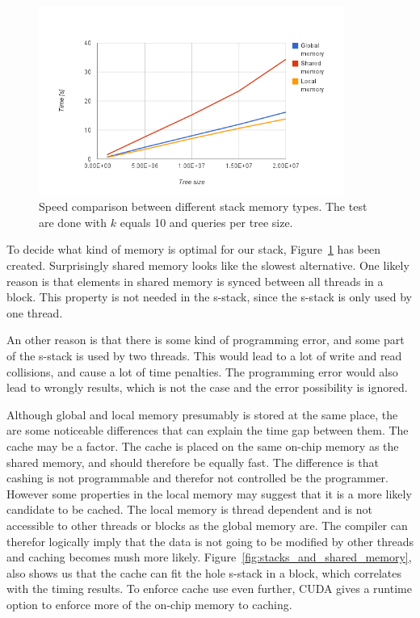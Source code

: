\begin{figure}[ht!]
    \centering
    \includegraphics[width=100mm]{../gfx/stack_speed.png}

    \caption{Speed comparison between different stack memory types. The test are done with $k$ equals 10 and  queries per tree size. }
    \label{tbl:stack_speed}
\end{figure}



To decide what kind of memory is optimal for our stack, Figure~\ref{tbl:stack_speed} has been created. Surprisingly shared memory looks like the slowest alternative. One likely reason is that elements in shared memory is synced between all threads in a block. This property is not needed in the s-stack, since the s-stack is only used by one thread. 


An other reason is that there is some kind of programming error, and some part of the s-stack is used by two threads. This would lead to a lot of write and read collisions, and cause a lot of time penalties. The programming error would also lead to wrongly results, which is not the case and the error possibility is ignored.

Although global and local memory presumably is stored at the same place, the are some noticeable differences that can explain the time gap between them. The cache may be a factor. The cache is placed on the same on-chip memory as the shared memory, and should therefore be equally fast. The difference is that cashing is not programmable and therefor not controlled be the programmer. However some properties in the local memory may suggest that it is a more likely candidate to be cached. The local memory is thread dependent and is not accessible to other threads or blocks as the global memory are. The compiler can therefor logically imply that the data is not going to be modified by other threads and caching becomes mush more likely. Figure~\ref{fig:stacks_and_shared_memory}, also shows us that the cache can fit the hole s-stack in a block, which correlates with the timing results. To enforce cache use even further, CUDA gives a runtime option to enforce more of the on-chip memory to caching.


